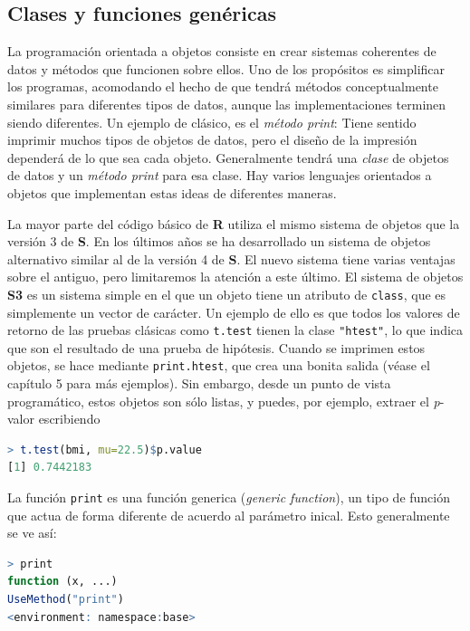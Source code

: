 \subsection{Clases y funciones genéricas}

La programación orientada a objetos consiste en crear sistemas coherentes de
datos y métodos que funcionen sobre ellos. Uno de los propósitos es simplificar
los programas, acomodando el hecho de que tendrá métodos conceptualmente
similares para diferentes tipos de datos, aunque las implementaciones terminen
siendo diferentes. Un ejemplo de clásico, es el \textit{método print}: Tiene
sentido imprimir muchos tipos de objetos de datos, pero el diseño de la
impresión dependerá de lo que sea cada objeto. Generalmente tendrá una
\textit{clase} de objetos de datos y un \textit{método print} para esa clase.
Hay varios lenguajes orientados a objetos que implementan estas ideas de
diferentes maneras.

La mayor parte del código básico de \textbf{R} utiliza el mismo sistema de
objetos que la versión 3 de \textbf{S}. En los últimos años se ha desarrollado
un sistema de objetos alternativo similar al de la versión 4 de \textbf{S}. El
nuevo sistema tiene varias ventajas sobre el antiguo, pero limitaremos la
atención a este último. El sistema de objetos \textbf{S3} es un sistema simple
en el que un objeto tiene un atributo de \texttt{class}, que es simplemente un
vector de carácter. Un ejemplo de ello es que todos los valores de retorno de
las pruebas clásicas como \texttt{t.test} tienen la clase \texttt{"htest"}, lo
que indica que son el resultado de una prueba de hipótesis. Cuando se imprimen
estos objetos, se hace mediante \texttt{print.htest}, que crea una bonita salida
(véase el capítulo 5 para más ejemplos). Sin embargo, desde un punto de vista
programático, estos objetos son sólo listas, y puedes, por ejemplo, extraer el
\textit{p}-valor escribiendo

\begin{lstlisting}[language=R]
> t.test(bmi, mu=22.5)$p.value
[1] 0.7442183
\end{lstlisting}

La función \texttt{print} es una función generica (\textit{generic function}),
un tipo de función que actua de forma diferente de acuerdo al parámetro inical.
Esto generalmente se ve así:

\begin{lstlisting}[language=R]
> print
function (x, ...)
UseMethod("print")
<environment: namespace:base>
\end{lstlisting}

